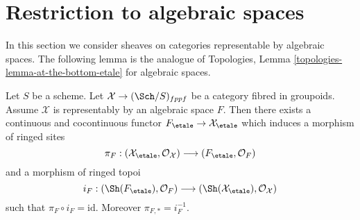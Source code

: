 \section{Restriction to algebraic spaces}
\label{section-restriction-algebraic-spaces}

\noindent
In this section we consider sheaves on categories representable by
algebraic spaces. The following lemma is the analogue of
Topologies, Lemma \ref{topologies-lemma-at-the-bottom-etale}
for algebraic spaces.

\begin{lemma}
\label{lemma-compare}
Let $S$ be a scheme. Let $\mathcal{X} \to (\Sch/S)_{fppf}$ be a category
fibred in groupoids. Assume $\mathcal{X}$ is representably by an algebraic
space $F$. Then there exists a continuous and cocontinuous functor
$
F_\etale \to \mathcal{X}_\etale
$
which induces a morphism of ringed sites
$$
\pi_F :
(\mathcal{X}_\etale, \mathcal{O}_\mathcal{X})
\longrightarrow
(F_\etale, \mathcal{O}_F)
$$
and a morphism of ringed topoi
$$
i_F :
(\Sh(F_\etale), \mathcal{O}_F)
\longrightarrow
(\Sh(\mathcal{X}_\etale), \mathcal{O}_\mathcal{X})
$$
such that $\pi_F \circ i_F = \text{id}$. Moreover $\pi_{F, *} = i_F^{-1}$.
\end{lemma}

